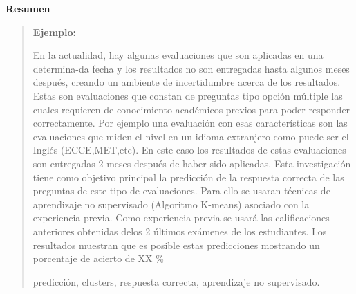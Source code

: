 \newpage
\begin{center}
 {\bf\LARGE Resumen}
\end{center} 
\vskip 0.5cm
\begin{quotation}
{\bf Ejemplo:}\par

En la actualidad, hay algunas evaluaciones que son aplicadas en una determina-da fecha y los resultados no son entregadas hasta algunos meses después, creando un ambiente de incertidumbre acerca de los resultados. Estas son evaluaciones que constan  de  preguntas  tipo  opción  múltiple  las  cuales  requieren  de  conocimiento académicos previos para poder responder correctamente. Por ejemplo una evaluación con esas características son las evaluaciones que miden el nivel en un idioma extranjero  como  puede  ser  el  Inglés  (ECCE,MET,etc).  En  este  caso  los  resultados de estas evaluaciones son entregadas 2 meses después de haber sido aplicadas.
\vskip 0.2cm 
Esta investigación tiene como objetivo principal la predicción de la respuesta correcta de las preguntas de este tipo de evaluaciones. Para ello se usaran técnicas de aprendizaje no supervisado (Algoritmo K-means) asociado con la experiencia previa. Como experiencia previa se usará las calificaciones anteriores obtenidas delos 2 últimos exámenes de los estudiantes. Los resultados muestran que es posible estas predicciones mostrando un porcentaje de acierto de XX \%   

\vskip 0.3cm
\hspace*{-0.6cm}{\bf Palabras claves:} predicción, clusters, respuesta correcta, aprendizaje no supervisado.
\end{quotation}


